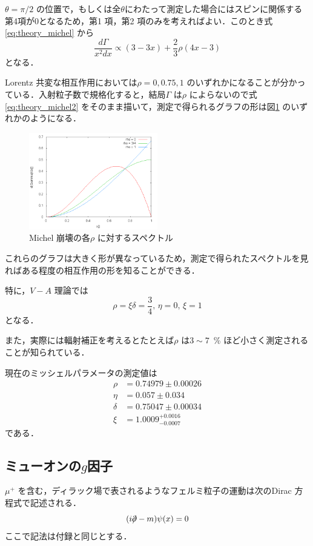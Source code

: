 $\theta = \pi/2$ の位置で，もしくは全$\theta$にわたって測定した場合にはスピンに関係する第4項が0となるため，第1 項，第2 項のみを考えればよい．このとき式\eqref{eq:theory_michel} から
\begin{equation}
\frac{d\Gamma}{x^{2}dx} \propto (3 - 3x) + \frac{2}{3}\rho (4x - 3)
\label{eq:theory_michel2}
\end{equation}
となる．

Lorentz 共変な相互作用においては$\rho = 0, 0.75, 1$ のいずれかになることが分かっている\cite{michel_interaction}．入射粒子数で規格化すると，結局$\Gamma$ は$\rho$ によらないので式\eqref{eq:theory_michel2} をそのまま描いて，測定で得られるグラフの形は図\ref{zu:michelpar} のいずれかのようになる．
\begin{figure}[htbp]
\centering
\includegraphics[width = 0.5\textwidth]{figure/abe/michelgraph.png}
\caption{Michel 崩壊の各$\rho$ に対するスペクトル}
\label{zu:michelpar}
\end{figure}
これらのグラフは大きく形が異なっているため，測定で得られたスペクトルを見ればある程度の相互作用の形を知ることができる．

特に，$V-A$ 理論では
\[ \rho = \xi\delta = \frac{3}{4},\, \eta = 0,\, \xi = 1 \]
となる．

また，実際には輻射補正を考えるとたとえば$\rho$ は$3 \sim 7$~\% ほど小さく測定されることが知られている．

現在のミッシェルパラメータの測定値は
\begin{align*}
\rho &= 0.74979 \pm 0.00026\\
\eta &= 0.057 \pm 0.034\\
\delta &= 0.75047 \pm 0.00034\\
\xi &= 1.0009^{+0.0016}_{-0.0007}
\end{align*}
である\cite{PDG}．
	
\subsection{ミューオンの$g$因子}
$\mu^{+}$ を含む，ディラック場で表されるようなフェルミ粒子の運動は次のDirac 方程式で記述される．
\begin{equation}
(i\Slash{\partial} - m)\psi(x) = 0
\label{eq:theory_dirac}
\end{equation}
ここで記法は付録と同じとする．

